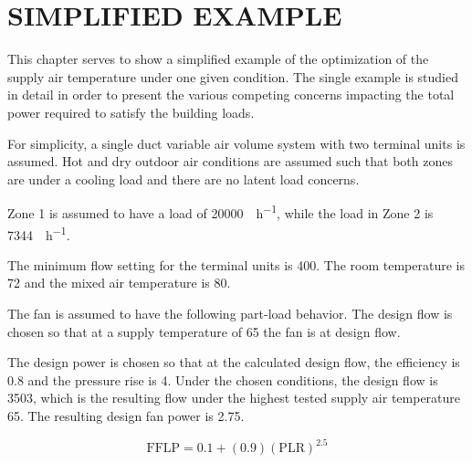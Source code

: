 \chapter{\texorpdfstring{\MakeUppercase{Simplified Example}}{Simplified Example}}

This chapter serves to show a simplified example of the optimization of
the supply air temperature under one given condition. The single example
is studied in detail in order to present the various competing concerns
impacting the total power required to satisfy the building loads. 

For simplicity, a single duct variable air volume system with two
terminal units is assumed. Hot and dry outdoor air conditions are
assumed such that both zones are under a cooling load and there are no
latent load concerns.  

Zone 1 is assumed to have a load of \SI{20000}{\btu\per\hour}, while the
load in Zone 2 is \SI{7344}{\btu\per\hour}. 

The minimum flow setting for the terminal units is \SI{400}{\cfm}. The
room temperature is \SI{72}{\degreeF} and the mixed air temperature is
\SI{80}{\degreeF}.

The fan is assumed to have the following part-load behavior. The design
flow is chosen so that at a supply temperature of \SI{65}{\degreeF} the
fan is at design flow. 

The design power is chosen so that at the calculated design flow, the
efficiency is \num{0.8} and the pressure rise is \SI{4}{\inchwater}.
Under the chosen conditions, the design flow is \SI{3503}{\cfm}, which
is the resulting flow under the highest tested supply air temperature
\SI{65}{\degreeF}. The resulting design fan power is \SI{2.75}{\hp}. 

\begin{equation}
    \text{FFLP} = 0.1 + (0.9)(\text{PLR})^{2.5}
\end{equation}

